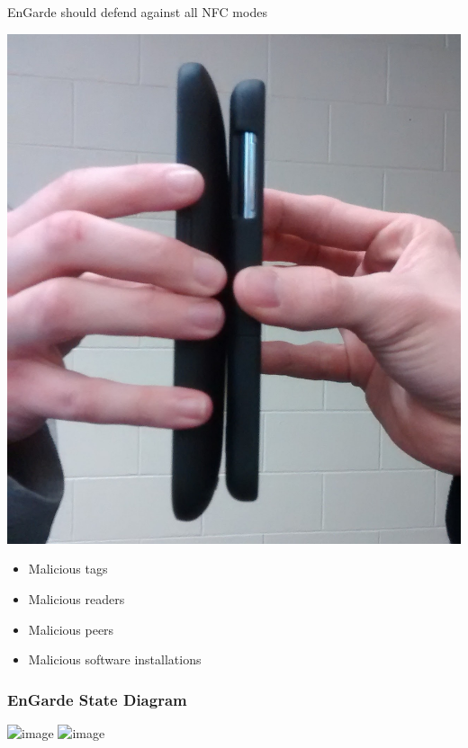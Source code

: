 \documentclass[unknownkeysallowed]{beamer}
\begin{document}
\begin{frame}
\begin{center}
\begin{block}{EnGarde should defend against all NFC modes}
\begin{center}
        \includegraphics[width=\linewidth,height=0.3\textheight,keepaspectratio]{figures/peer.jpg}

        \vspace{3mm}

        \begin{minipage}{.7\textwidth}
          \begin{itemize}
            \item{Malicious tags}
            \item{Malicious readers}
            \item{Malicious peers}
            \item{Malicious software installations}
          \end{itemize}
        \end{minipage}

      \end{center}
    \end{block}
  \end{center}
\end{frame}



\begin{frame}
\frametitle{EnGarde State Diagram}
\begin{center}
  \includegraphics<1>[width=.8\linewidth,height=.7\textheight,keepaspectratio]{figures/engarde/states1.png}
  \includegraphics<2>[width=.8\linewidth,height=.7\textheight,keepaspectratio]{figures/engarde/states1a.png}%
\end{center}
\end{frame}
\end{document}
